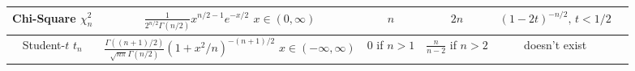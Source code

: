 \begin{center}
\begin{tabular}{cccccc}
          \hline
          \shortstack{Chi-Square                                                                                            \\ $\chi_n^2$} & \shortstack{$\frac{1}{2^{n/2}\Gamma(n/2)}x^{n/2 - 1}e^{-x/2}$\\$x \in (0, \infty) $} & $n$  & $2n$ & $(1 - 2t)^{-n/2}, \, t < 1/2$\\
          \hline
          \shortstack{Student-$t$                                                                                           \\ $t_n$} & \shortstack{$\frac{\Gamma((n+1)/2)}{\sqrt{n\pi} \Gamma(n/2)} (1+x^2/n)^{-(n+1)/2}$\\$x \in (-\infty, \infty)$} & $0$ if $n>1$ & $\frac{n}{n-2}$ if $n>2$ & doesn't exist\\
          \hline
     \end{tabular}
\end{center}
\clearpage
\resumecol
